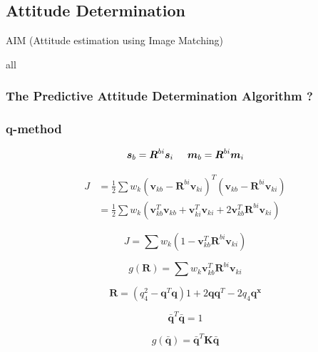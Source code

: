 \documentclass[12pt,a4paper,oneside]{article}
\begin{document}
\subsection{Attitude Determination}
\cite{jenssen2011comparison}\par
AIM (Attitude estimation using Image Matching)\cite{delabie2012highly}\par
all \cite{hall2003spacecraft} \cite{markley1999estimate}
\subsubsection{The Predictive Attitude Determination Algorithm ?}
\cite{park2006attitude}
\subsubsection{q-method}

\begin{equation}
\bm{s}_b = \bm{R}^{bi}\bm{s}_i \hspace{0.5cm} \bm{m}_b = \bm{R}^{bi}\bm{m}_i
\end{equation}

\begin{equation}
\begin{split}
J &= \frac{1}{2} \sum w_k (\bm{v}_{kb} - \bm{R}^{bi} \bm{v}_{ki})^T (\bm{v}_{kb} - \bm{R}^{bi} \bm{v}_{ki}) \\ 
&= \frac{1}{2} \sum w_k (\bm{v}_{kb}^T\bm{v}_{kb} + \bm{v}_{ki}^T\bm{v}_{ki} + 2\bm{v}_{kb}^T \bm{R}^{bi} \bm{v}_{ki})
\end{split}
\end{equation}


\begin{equation}
J = \sum w_k (1 - \bm{v}_{kb}^T \bm{R}^{bi} \bm{v}_{ki})
\end{equation}

\begin{equation}
g(\bm{R}) = \sum w_k \bm{v}_{kb}^T \bm{R}^{bi} \bm{v}_{ki}
\end{equation}

\begin{equation}
\bm{R} = (q_4^2 - \bm{q}^T\bm{q})1 + 2\bm{qq}^T - 2q_4\bm{q}^{\bm{x}}
\end{equation}

\begin{equation}
\bm{\bar{q}}^T\bm{\bar{q}} = 1
\end{equation}

\begin{equation}
g(\bm{\bar{q}}) = \bm{\bar{q}}^T\bm{K}\bm{\bar{q}}
\end{equation}
\end{document}
